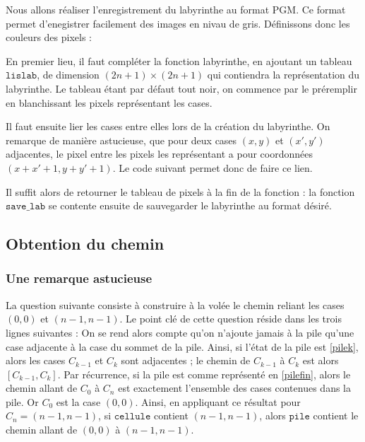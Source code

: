 \documentclass[11pt,a4paper]{article}
\begin{document}
Nous allons réaliser l'enregistrement du labyrinthe au format PGM. Ce format permet d'enegistrer facilement des images en nivau de gris. Définissons donc les couleurs des pixels :

%

\par
En premier lieu, il faut compléter la fonction labyrinthe, en ajoutant un tableau $\mathtt{lislab}$, de dimension $(2n+1) \times (2n+1)$ qui contiendra la représentation du labyrinthe. Le tableau étant par défaut tout noir, on commence par le préremplir en blanchissant les pixels représentant les cases.

%

Il faut ensuite lier les cases entre elles lors de la création du labyrinthe. On remarque de manière astucieuse, que pour deux cases $(x,y)$ et $(x',y')$ adjacentes, le pixel entre les pixels les représentant a pour coordonnées $(x+x'+1,y+y'+1)$. Le code suivant permet donc de faire ce lien.

%

Il suffit alors de retourner le tableau de pixels à la fin de la fonction : la fonction $\mathtt{save\_lab}$ se contente ensuite de sauvegarder le labyrinthe au format désiré.

%


\subsection{Obtention du chemin}

\subsubsection{Une remarque astucieuse}
La question suivante consiste à construire à la volée le chemin reliant les cases $(0,0)$ et $(n-1,n-1)$.  Le point clé de cette question réside dans les trois lignes suivantes :
%
On se rend alors compte qu'on n'ajoute jamais à la pile qu'une case adjacente à la case du sommet de la pile. Ainsi, si l'état de la pile est \ref{pilek}, alors les cases $C_{k-1}$ et $C_{k}$ sont adjacentes ; le chemin de $C_{k-1}$ à $C_{k}$ est alors $[C_{k-1},C_{k}]$. Par récurrence, si la pile est comme représenté en \ref{pilefin}, alors le chemin allant de $C_0$ à $C_n$ est exactement l'ensemble des cases contenues dans la pile. Or $C_0$ est la case $(0,0)$. Ainsi, en appliquant ce résultat pour $C_n = (n-1,n-1)$, si $\mathtt{cellule}$ contient $(n-1,n-1)$, alors $\mathtt{pile}$ contient le chemin allant de $(0,0)$ à $(n-1,n-1)$.
\end{document}
